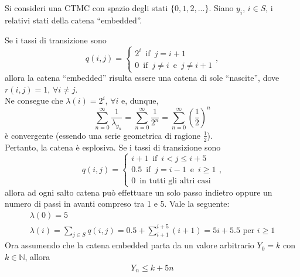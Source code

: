 \documentclass[11pt,largemargins]{homework}
\begin{document}
  \section{}%
  Si consideri una CTMC con spazio degli stati $\{0,1,2,...\}$. Siano $y_{i}$, $i\in S$, i relativi stati della catena ``embedded''.
  \begin{alphaparts}
  \questionpart
  Se i tassi di transizione sono
  \begin{equation*}
  q\left(i,j\right)=\begin{cases}2^{i} \,\,\,\text{if}\,\,\,j=i+1\\0 \,\,\,\text{if}\,\,\,j\neq i\,\,\,\text{e}\,\,\,j\neq i+1\end{cases},
  \end{equation*}
  allora la catena ``embedded'' risulta essere una catena di sole ``nascite'', dove $r\left(i,j\right)=1$, $\forall i \neq j$.\\
  Ne consegue che $\lambda\left(i\right)=2^{i}$, $\forall i$ e, dunque,
  \begin{equation*}
  \sum_{n=0}^{\infty}\frac{1}{\lambda_{y_{n}}}=\sum_{n=0}^{\infty}\frac{1}{2^{n}}=\sum_{n=0}^{\infty}\left(\frac{1}{2}\right)^{n}
  \end{equation*}
  è convergente (essendo una serie geometrica di ragione $\frac{1}{2}$).\\
  Pertanto, la catena è esplosiva.
  \questionpart
  Se i tassi di transizione sono
  \begin{equation*}
  q\left(i,j\right)=\begin{cases}i+1 \,\,\,\text{if}\,\,\,i<j\leq i+5\\0.5 \,\,\,\text{if}\,\,\,j=i-1\,\,\,\text{e}\,\,\,i\geq 1\\0 \,\,\, \text{in tutti gli altri casi}\end{cases},
  \end{equation*}
 allora ad ogni salto catena può effettuare un solo passo indietro oppure un numero di passi in avanti compreso tra 1 e 5. Vale la seguente:
 \begin{gather*}
   \lambda(0) = 5\\
   \lambda(i) =  \sum \limits_{j \in S}^{} q(i,j) = 0.5 +  \sum \limits_{i+1}^{i+5}(i+1) = 5i+5.5 \text{ per } i\geq 1
 \end{gather*}
Ora assumendo che la catena embedded parta da un valore arbitrario \(Y_0=k\) con \(k \in \mathbb{N}\), allora
\begin{gather*}
  Y_n \leq k + 5n
\end{gather*}

\end{alphaparts}
\end{document}
